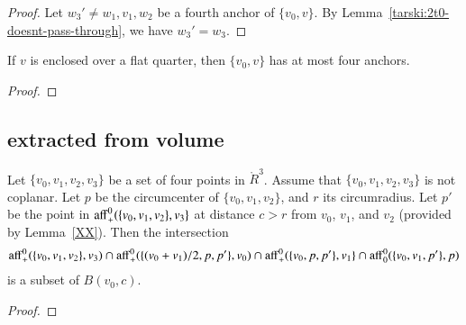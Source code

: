 \begin{tarskidata}
\begin{tarski}
\begin{proof}
Let $w_3'\ne w_1,v_1,w_2$ be a fourth anchor of $\{v_0,v\}$. By
Lemma~\ref{tarski:2t0-doesnt-pass-through}, we have $w_3'=w_3$.
\end{proof}
\end{tarski}



\begin{tarski}

\begin{lemma}
If $v$ is enclosed over a flat quarter, then $\{v_0,v\}$ has at most four
anchors.
\end{lemma}

\begin{proof}
\end{proof}
\end{tarski}









\begin{tarski}
\subsection{extracted from volume}
\rating{}

\begin{lemma}
Let $\{v_0,v_1,v_2,v_3\}$ be a set of four points in $\ring{R}^3$.
Assume that $\{v_0,v_1,v_2,v_3\}$ is not coplanar.  Let $p$
be the circumcenter of $\{v_0,v_1,v_2\}$, and $r$ its circumradius.  
Let $p'$ be the
point in ${\operatorname{aff}}_+^0(\{v_0,v_1,v_2\},v_3\}$ at distance
$c > r$ from $v_0$, $v_1$, and $v_2$ (provided by Lemma~\ref{XX}). %
Then the intersection
  $$
  {\operatorname{aff}}^0_+(\{v_0,v_1,v_2\},v_3) \cap
  {\operatorname{aff}}^0_+(\{(v_0+v_1)/2,p,p' \},v_0) \cap
  {\operatorname{aff}}^0_+(\{v_0,p,p'\},v_1\}\cap
  {\operatorname{aff}}^0_0(\{v_0,v_1,p'\},p)
  $$
is a subset of $B(v_0,c)$.
\end{lemma}

\begin{proof}
\end{proof}
\end{tarski}






\end{tarskidata}
